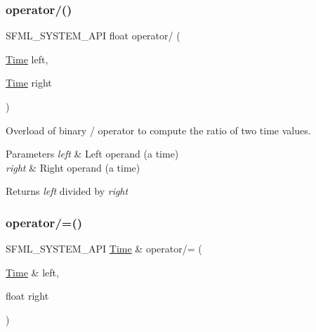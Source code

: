 \subsubsection{\texorpdfstring{operator/()}{operator/()}\hspace{0.1cm}{\footnotesize\ttfamily [3/3]}}
{\footnotesize\ttfamily S\+F\+M\+L\+\_\+\+S\+Y\+S\+T\+E\+M\+\_\+\+A\+PI float operator/ (\begin{DoxyParamCaption}\item[{\mbox{\hyperlink{classsf_1_1_time}{Time}}}]{left,  }\item[{\mbox{\hyperlink{classsf_1_1_time}{Time}}}]{right }\end{DoxyParamCaption})\hspace{0.3cm}{\ttfamily [related]}}



Overload of binary / operator to compute the ratio of two time values. 


\begin{DoxyParams}{Parameters}
{\em left} & Left operand (a time) \\
\hline
{\em right} & Right operand (a time)\\
\hline
\end{DoxyParams}
\begin{DoxyReturn}{Returns}
{\itshape left} divided by {\itshape right} \begin{DoxyVerb}\end{DoxyVerb}
 
\end{DoxyReturn}
\mbox{\label{classsf_1_1_time_a9835490c54cab06492ec3aa9e9275ef9}} 
\subsubsection{\texorpdfstring{operator/=()}{operator/=()}\hspace{0.1cm}{\footnotesize\ttfamily [1/2]}}
{\footnotesize\ttfamily S\+F\+M\+L\+\_\+\+S\+Y\+S\+T\+E\+M\+\_\+\+A\+PI \mbox{\hyperlink{classsf_1_1_time}{Time}} \& operator/= (\begin{DoxyParamCaption}\item[{\mbox{\hyperlink{classsf_1_1_time}{Time}} \&}]{left,  }\item[{float}]{right }\end{DoxyParamCaption})\hspace{0.3cm}{\ttfamily [related]}}



